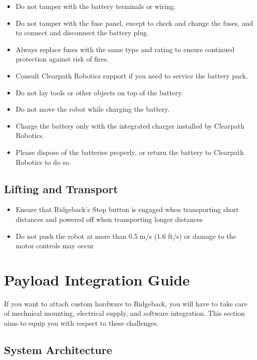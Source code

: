 \documentclass[]{clearpath-latex/clearpath-manual}
\begin{document}
\begin{itemize}[nolistsep]
	\item Do not tamper with the battery terminals or wiring.
	\item Do not tamper with the fuse panel, except to check and change the fuses, and to connect and disconnect the 	battery plug.
	\item Always replace fuses with the same type and rating to ensure continued protection against risk of fires.
	\item Consult Clearpath Robotics support if you need to service the battery pack.
	\item Do not lay tools or other objects on top of the battery.
	\item Do not move the robot while charging the battery.
	\item Charge the battery only with the integrated charger installed by Clearpath Robotics.
	\item Please dispose of the batteries properly, or return the battery to Clearpath Robotics to do so.
\end{itemize}

\subsection{Lifting and Transport}

\begin{itemize}[nolistsep]
	\item Ensure that Ridgeback's Stop button is engaged when transporting short distances and powered off when transporting longer distances
	\item Do not push the robot at more than 0.5 m/s (1.6 ft/s) or damage to the motor controls may occur
\end{itemize}


\section{Payload Integration Guide}

If you want to attach custom hardware to Ridgeback, you will have to take care of mechnical mounting, electrical supply, and software integration.  This section aims to equip you with respect to these challenges.

\subsection{System Architecture}
\end{document}

